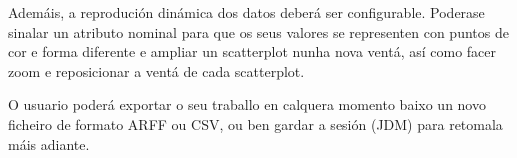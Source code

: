 Ademáis, a reprodución dinámica dos datos deberá ser configurable. Poderase sinalar un atributo nominal para que os seus valores se representen con puntos de cor e forma diferente e ampliar un scatterplot nunha nova ventá, así como facer zoom e reposicionar a ventá de cada scatterplot. 

O usuario poderá exportar o seu traballo en calquera momento baixo un novo ficheiro de formato ARFF ou CSV, ou ben gardar a sesión (JDM) para retomala máis adiante. 
